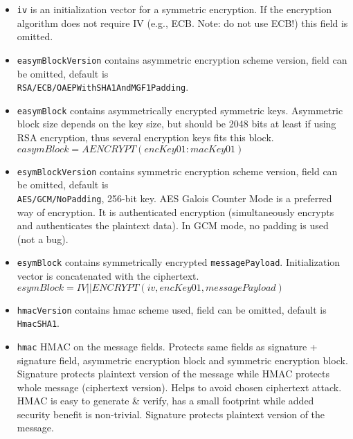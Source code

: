 \documentclass[a4paper,10pt]{article}
\begin{document}
\begin{itemize}
$
sig = SIGN_{privKey}(hash(protocolType:protocolVersion:ampType:ampVersion:sequenceNumber:randomNonce:sender:
destination:destinationType:iv:encKey01:macKey01:messagePayload)) 
$

\textbf{Update v2}: signature now includes \verb#messageSentMiliUTC#;

\item \verb#iv# is an initialization vector for a symmetric encryption. If the encryption algorithm does not require IV (e.g., ECB. Note: do not use ECB!)
this field is omitted.

\item \verb#easymBlockVersion# contains asymmetric encryption scheme version, field can be omitted, default is \\\verb#RSA/ECB/OAEPWithSHA1AndMGF1Padding#.
\item \verb#easymBlock# contains asymmetrically encrypted symmetric keys. Asymmetric block size depends on the key size, but should be 2048 bits
at least if using RSA encryption, thus several encryption keys fits this block.\\
$easymBlock = AENCRYPT(encKey01:macKey01)$

\item \verb#esymBlockVersion# contains symmetric encryption scheme version, field can be omitted, default is \\\verb#AES/GCM/NoPadding#, 256-bit key.
AES Galois Counter Mode is a preferred way of encryption. 
It is authenticated encryption (simultaneously encrypts and authenticates the plaintext data). In GCM mode, no padding is used (not a bug).

\item \verb#esymBlock# contains symmetrically encrypted \verb#messagePayload#. Initialization vector is concatenated with the ciphertext.\\
$esymBlock = IV || ENCRYPT(iv, encKey01, messagePayload)$

\item \verb#hmacVersion# contains hmac scheme used, field can be omitted, default is \verb#HmacSHA1#.

\item \verb#hmac# HMAC on the message fields. Protects same fields as signature + signature field, 
asymmetric encryption block and symmetric encryption block. Signature protects plaintext version of the message 
while HMAC protects whole message (ciphertext version). Helps to avoid chosen ciphertext attack. 
HMAC is easy to generate \& verify, has a small footprint while added security benefit is non-trivial.
Signature protects plaintext version of the message.


\end{itemize}
\end{document}
